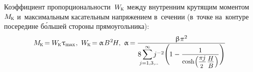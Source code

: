 \documentclass[14pt]{extarticle}
\begin{document}
Коэффициент пропорциональности~${W_{\hspace{-0.1ex}\mathrm{\scalebox{.6}{K}}}}$ между внутренним крутящим моментом~${M_{\hspace{-0.1ex}\mathrm{\scalebox{.6}{K}}}}$ и~максимальным касательным напряжением в~сечении (в~точке на~контуре посередине б\'{о}льшей стороны прямоугольника):
\[
M_{\hspace{-0.1ex}\mathrm{\scalebox{.6}{K}}} \hspace{-0.3ex}=\hspace{-0.1ex}
W_{\hspace{-0.1ex}\mathrm{\scalebox{.6}{K}}} \hspace{.1ex} \uptau_{\scalebox{.75}{max}}
\hspace{.1ex} , \hspace{.33em}
W_{\hspace{-0.1ex}\mathrm{\scalebox{.6}{K}}} \hspace{-0.3ex}=\hspace{-0.1ex}
\upalpha \hspace{.2ex} B^{\hspace{.1ex}2} \hspace{-0.2ex} H
, \hspace{.33em}
%
\upalpha \hspace{-0.2ex}=\hspace{-0.1ex}
\displaystyle\frac{\raisebox{-0.1em}{$\upbeta \hspace{.1ex} \pi^2$}}{8 \hspace{.4ex}
\scalebox{1}{$\displaystyle\sum_{\mathclap{\hspace{.4em}\scalebox{1}{$\scriptstyle j=1,3,..$}}}^{\raisebox{-0.1em}{\scalebox{.75}{$\infty$}}}$} \hspace{.3ex} j^{-2} \Biggl( \hspace{-.1ex} 1 - \displaystyle\frac{\raisebox{-0.1em}{\scalebox{.96}{$1$}}}{%
\scalebox{.93}{$
\operatorname{cosh} \hspace{-0.33ex} \left( \hspace{-0.1ex} \displaystyle\frac{\raisebox{-0.18em}{$\pi \hspace{-0.1ex} j$}}{\scalebox{.88}{$2$}} \hspace{.2ex} \displaystyle\frac{\raisebox{-0.2em}{$H$}}{B} \hspace{.1ex} \right)
$}} \Biggr)}
\]
\end{document}
